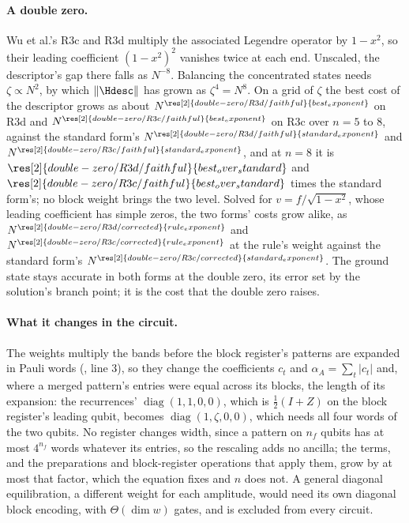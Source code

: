 \paragraph{A double zero.} Wu et al.'s R3c and R3d multiply the associated Legendre operator by $1-x^2$, so their leading coefficient $(1-x^2)^2$ vanishes twice at each end. Unscaled, the descriptor's gap there falls as $N^{-8}$. Balancing the concentrated states needs $\zeta\propto N^2$, by which $\|\Hdesc\|$ has grown as $\zeta^4=N^8$. On a grid of $\zeta$ the best cost of the descriptor grows as about $N^{\res[2]{double-zero/R3d/faithful}{best_exponent}}$ on R3d and $N^{\res[2]{double-zero/R3c/faithful}{best_exponent}}$ on R3c over $n=5$ to $8$, against the standard form's $N^{\res[2]{double-zero/R3d/faithful}{standard_exponent}}$ and $N^{\res[2]{double-zero/R3c/faithful}{standard_exponent}}$, and at $n=8$ it is $\res[2]{double-zero/R3d/faithful}{best_over_standard}$ and $\res[2]{double-zero/R3c/faithful}{best_over_standard}$ times the standard form's; no block weight brings the two level. Solved for $v=f/\sqrt{1-x^2}$, whose leading coefficient has simple zeros, the two forms' costs grow alike, as $N^{\res[2]{double-zero/R3d/corrected}{rule_exponent}}$ and $N^{\res[2]{double-zero/R3c/corrected}{rule_exponent}}$ at the rule's weight against the standard form's $N^{\res[2]{double-zero/R3c/corrected}{standard_exponent}}$. The ground state stays accurate in both forms at the double zero, its error set by the solution's branch point; it is the cost that the double zero raises.

\paragraph{What it changes in the circuit.} The weights multiply the bands before the block register's patterns are expanded in Pauli words (, line 3), so they change the coefficients $c_t$ and $\alpha_A=\sum_t|c_t|$ and, where a merged pattern's entries were equal across its blocks, the length of its expansion: the recurrences' $\operatorname{diag}(1,1,0,0)$, which is $\tfrac12(I+Z)$ on the block register's leading qubit, becomes $\operatorname{diag}(1,\zeta,0,0)$, which needs all four words of the two qubits. No register changes width, since a pattern on $n_f$ qubits has at most $4^{n_f}$ words whatever its entries, so the rescaling adds no ancilla; the terms, and the preparations and block-register operations that apply them, grow by at most that factor, which the equation fixes and $n$ does not. A general diagonal equilibration, a different weight for each amplitude, would need its own diagonal block encoding, with $\Theta(\dim w)$ gates, and is excluded from every circuit.

